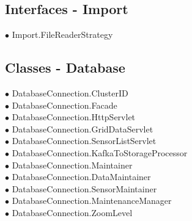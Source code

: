 \subsection*{Interfaces - Import}
\hspace{0.0cm} $\bullet$ Import.FileReaderStrategy {\tiny {}} \\
\subsection*{Classes - Database}
{\raggedright
	\hspace{0.0cm} $\bullet$ DatabaseConnection.ClusterID {\tiny {}} \\
	\hspace{0.0cm} $\bullet$ DatabaseConnection.Facade {\tiny {}} \\
	\hspace{0.0cm} $\bullet$ DatabaseConnection.HttpServlet {\tiny {}} \\
	\hspace{1.0cm} $\bullet$ DatabaseConnection.GridDataServlet {\tiny {}} \\
	\hspace{1.0cm} $\bullet$ DatabaseConnection.SensorListServlet {\tiny {}} \\
	\hspace{0.0cm} $\bullet$ DatabaseConnection.KafkaToStorageProcessor {\tiny {}} \\
	\hspace{0.0cm} $\bullet$ DatabaseConnection.Maintainer {\tiny {}} \\
	\hspace{1.0cm} $\bullet$ DatabaseConnection.DataMaintainer {\tiny {}} \\
	\hspace{1.0cm} $\bullet$ DatabaseConnection.SensorMaintainer {\tiny {}} \\
	\hspace{0.0cm} $\bullet$ DatabaseConnection.MaintenanceManager {\tiny {}} \\
	\hspace{0.0cm} $\bullet$ DatabaseConnection.ZoomLevel {\tiny {}} \\
}
